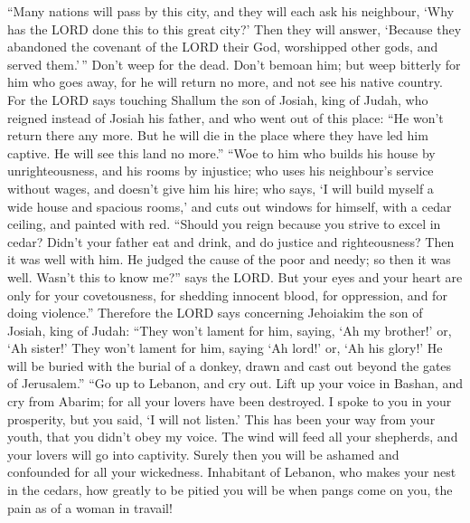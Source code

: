  ``Many nations will pass by this city, and they will each
ask his neighbour, `Why has the LORD done this to this great city?'
 Then they will answer, `Because they abandoned the covenant
of the LORD their God, worshipped other gods, and served them.'\,''
 Don't weep for the dead. Don't bemoan him; but weep
bitterly for him who goes away, for he will return no more, and not see
his native country.  For the LORD says touching Shallum the
son of Josiah, king of Judah, who reigned instead of Josiah his father,
and who went out of this place: ``He won't return there any more.
 But he will die in the place where they have led him
captive. He will see this land no more.''  ``Woe to him who
builds his house by unrighteousness, and his rooms by injustice; who
uses his neighbour's service without wages, and doesn't give him his
hire;  who says, `I will build myself a wide house and
spacious rooms,' and cuts out windows for himself, with a cedar ceiling,
and painted with red.  ``Should you reign because you
strive to excel in cedar? Didn't your father eat and drink, and do
justice and righteousness? Then it was well with him.  He
judged the cause of the poor and needy; so then it was well. Wasn't this
to know me?'' says the LORD.  But your eyes and your heart
are only for your covetousness, for shedding innocent blood, for
oppression, and for doing violence.''  Therefore the LORD
says concerning Jehoiakim the son of Josiah, king of Judah: ``They won't
lament for him, saying, `Ah my brother!' or, `Ah sister!' They won't
lament for him, saying `Ah lord!' or, `Ah his glory!'  He
will be buried with the burial of a donkey, drawn and cast out beyond
the gates of Jerusalem.''  ``Go up to Lebanon, and cry out.
Lift up your voice in Bashan, and cry from Abarim; for all your lovers
have been destroyed.  I spoke to you in your prosperity,
but you said, `I will not listen.' This has been your way from your
youth, that you didn't obey my voice.  The wind will feed
all your shepherds, and your lovers will go into captivity. Surely then
you will be ashamed and confounded for all your wickedness.
 Inhabitant of Lebanon, who makes your nest in the cedars,
how greatly to be pitied you will be when pangs come on you, the pain as
of a woman in travail!

